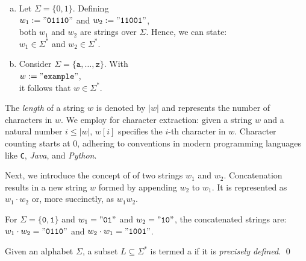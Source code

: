 \examplesEng
\begin{enumerate}[(a)]
\item Let \( \Sigma = \{0, 1\} \). Defining
      \\[0.2cm]
      \hspace*{1.3cm}
      \( w_1 := \mathtt{"01110"} \) and \( w_2 := \mathtt{"11001"} \),
      \\[0.2cm]
      both \( w_1 \) and \( w_2 \) are strings over \( \Sigma \). Hence, we can state:
      \\[0.2cm]
      \hspace*{1.3cm}
      \( w_1 \in \Sigma^* \) and \( w_2 \in \Sigma^* \).
\item Consider \( \Sigma = \{\mathtt{a}, \ldots, \mathtt{z}\} \). With
      \\[0.2cm]
      \hspace*{1.3cm}
      \( w := \mathtt{"example"} \),
      \\[0.2cm]
      it follows that \( w \in \Sigma^* \). \eox
\end{enumerate}

The \emph{length} of a string \( w \) is denoted by \( |w| \) and represents the number of characters in \( w
\).  
We employ  for character extraction: given a string \( w \) and a natural number
\( i \leq |w| \), \( w[i] \) specifies the \( i \)-th character in \( w \). Character counting starts at 0, adhering to
conventions in modern programming languages like \texttt{C}, \textsl{Java}, and \textsl{Python}. 

Next, we introduce the concept of   of two strings \( w_1 \) and
\(w_2 \). Concatenation results in a new string \( w \) formed by appending \( w_2 \) to \( w_1 \). It is
represented as \( w_1 \cdot w_2 \) or, more succinctly, as \( w_1w_2 \). 

\vspace*{0.3cm}

\exampleEng
For \( \Sigma = \{\mathtt{0}, \mathtt{1}\} \) and \( w_1 = \mathtt{"01"} \) and \( w_2 = \mathtt{"10"} \), the concatenated strings are:
\\[0.2cm]
\hspace*{1.3cm}
\( w_1 \cdot w_2 = \mathtt{"0110"} \) and \( w_2 \cdot w_1 = \mathtt{"1001"} \). \eox

\begin{Definition} \hspace*{\fill} \linebreak
Given an alphabet \( \Sigma \), a subset \( L \subseteq \Sigma^* \) is termed a  if it is \emph{precisely defined}.  \qed
\end{Definition}

